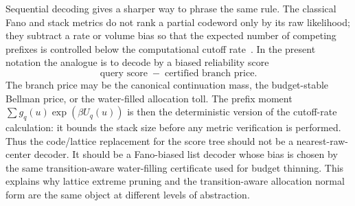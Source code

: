 \documentclass[10pt]{article}
\theoremstyle{definition}
\begin{document}
Sequential decoding gives a sharper way to phrase the same rule.  The classical
Fano and stack metrics do not rank a partial codeword only by its raw
likelihood; they subtract a rate or volume bias so that the expected number of
competing prefixes is controlled below the computational cutoff
rate~\cite{WR61,Fano63,Jel69}.  In the present notation the analogue is to
decode by a biased reliability score
\[
   \text{query score}
   \;-\;
   \text{certified branch price}.
\]
The branch price may be the canonical continuation mass, the budget-stable
Bellman price, or the water-filled allocation toll.  The prefix moment
\(\sum g_q(u)\exp(\beta U_q(u))\) is then the deterministic version of the
cutoff-rate calculation: it bounds the stack size before any metric
verification is performed.  Thus the code/lattice replacement for the score
tree should not be a nearest-raw-center decoder.  It should be a Fano-biased
list decoder whose bias is chosen by the same transition-aware water-filling
certificate used for budget thinning.  This explains why lattice extreme
pruning and the transition-aware allocation normal form are the same object at
different levels of abstraction.
\end{document}

